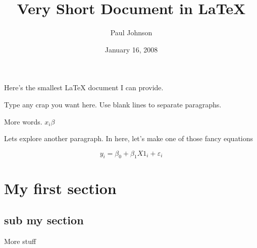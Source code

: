 \documentclass{article}
\begin{document}
\author{Paul Johnson}
\date{January 16, 2008}
\title{Very Short Document in \LaTeX{}}
\maketitle
Here's the smallest \LaTeX{} document I can provide.

Type any crap you want here.
Use blank lines to separate paragraphs.

More words. $x_{i}\beta$

Lets explore another paragraph. In here, let's make one of those fancy equations

$$
y_{i} = \beta_{0} + \beta_{1} X1_{i} + \varepsilon_{i}
$$

\section{My first section}

\subsection{sub my section}

More stuff

\end{document}
